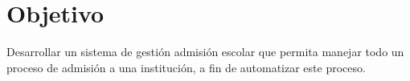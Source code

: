 \section{Objetivo}
    Desarrollar un sistema de gestión admisión escolar que permita manejar todo un proceso de admisión a una institución, a fin de automatizar este proceso.

